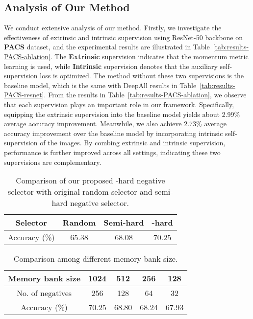 \subsection{Analysis of Our Method}
We conduct extensive analysis of our method.  
Firstly, we investigate the effectiveness of extrinsic and intrinsic supervision using ResNet-50 backbone on \textbf{PACS} dataset, and the experimental results are illustrated in Table~\ref{tab:results-PACS-ablation}.
The \textbf{Extrinsic} supervision indicates that the momentum metric learning is used, while \textbf{Intrinsic} supervision denotes that the auxiliary self-supervision loss is optimized. 
The method without these two supervisions is the baseline model, which is the same with DeepAll results in Table~\ref{tab:results-PACS-resnet}.
From the results in Table~\ref{tab:results-PACS-ablation}, we observe that each supervision plays an important role in our framework.
Specifically, equipping the extrinsic supervision into the baseline model yields about 2.99\% average accuracy improvement.
Meanwhile, we also achieve 2.73\% average accuracy improvement over the baseline model by incorporating intrinsic self-supervision of the images.
By combing extrinsic and intrinsic supervision, performance is further improved across all settings, indicating these two supervisions are complementary. 





\begin{table*} [!t]
	\centering
	\caption{Comparison of our proposed -hard negative selector with original random selector and semi-hard negative selector.}
	\label{tab:results-ablation-selector}
{
		\setlength\tabcolsep{1.5pt}
		\begin{tabular}{c|ccc}
			\toprule[1pt]
			\T
			Selector & Random & Semi-hard & -hard \\ \hline \T
			Accuracy (\%) &65.38 &68.08&70.25   \\
			\toprule[1pt]
		\end{tabular}
	}
\end{table*}
\begin{table*} [!t]
	\centering
	\caption{Comparison among different memory bank size.}
	\label{tab:results-ablation-bank}
{
		\setlength\tabcolsep{1.5pt}
		\begin{tabular}{c|cccc}
			\toprule[1pt]
			\T
			Memory bank size  & 1024 & 512 & 256 & 128 \\ \hline
			No. of negatives  & 256 & 128 & 64 & 32\\ \hline
			\T 
			Accuracy (\%) &70.25 &68.80&68.24 & 67.93   \\
			\toprule[1pt]
		\end{tabular}
	}
\end{table*}


